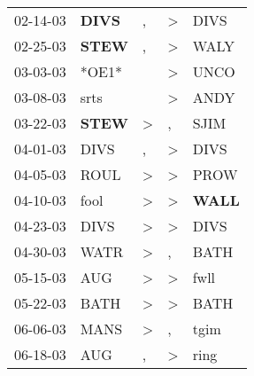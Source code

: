 \begin{supertabular}{p{0.07\textwidth}p{0.06\textwidth}p{0.02\textwidth}p{0.02\textwidth}p{0.06\textwidth}}
          02-14-03\textsuperscript{} &  \textbf{DIVS\textsuperscript{}} &                , &     \textgreater &           DIVS\textsuperscript{} \\
          02-25-03\textsuperscript{} &  \textbf{STEW\textsuperscript{}} &                , &     \textgreater &           WALY\textsuperscript{} \\
          03-03-03\textsuperscript{} &                            *OE1* &                  &     \textgreater &           UNCO\textsuperscript{} \\
          03-08-03\textsuperscript{} &           srts\textsuperscript{} &                  &     \textgreater &           ANDY\textsuperscript{} \\
          03-22-03\textsuperscript{} &  \textbf{STEW\textsuperscript{}} &     \textgreater &                , &           SJIM\textsuperscript{} \\
          04-01-03\textsuperscript{} &           DIVS\textsuperscript{} &                , &     \textgreater &           DIVS\textsuperscript{} \\
          04-05-03\textsuperscript{} &           ROUL\textsuperscript{} &     \textgreater &     \textgreater &           PROW\textsuperscript{} \\
          04-10-03\textsuperscript{} &           fool\textsuperscript{} &     \textgreater &     \textgreater &  \textbf{WALL\textsuperscript{}} \\
          04-23-03\textsuperscript{} &           DIVS\textsuperscript{} &     \textgreater &     \textgreater &           DIVS\textsuperscript{} \\
          04-30-03\textsuperscript{} &           WATR\textsuperscript{} &     \textgreater &                , &           BATH\textsuperscript{} \\
          05-15-03\textsuperscript{} &            AUG\textsuperscript{} &     \textgreater &     \textgreater &           fwll\textsuperscript{} \\
          05-22-03\textsuperscript{} &           BATH\textsuperscript{} &     \textgreater &     \textgreater &           BATH\textsuperscript{} \\
          06-06-03\textsuperscript{} &           MANS\textsuperscript{} &     \textgreater &                , &           tgim\textsuperscript{} \\
          06-18-03\textsuperscript{} &            AUG\textsuperscript{} &                , &     \textgreater &           ring\textsuperscript{} \\

\end{supertabular}
